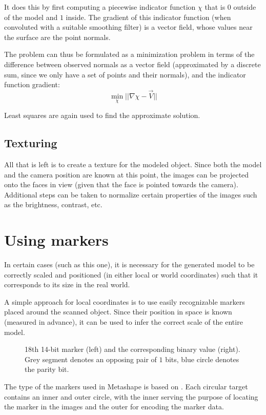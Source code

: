 It does this by first computing a piecewise indicator function $\chi$ that is $0$ outside of the model and $1$ inside. The gradient of this indicator function (when convoluted with a suitable smoothing filter) is a vector field, whose values near the surface are the point normals.

The problem can thus be formulated as a minimization problem in terms of the difference between observed normals as a vector field (approximated by a discrete sum, since we only have a set of points and their normals), and the indicator function gradient:
\begin{equation} \min_\chi || \nabla \chi - \vec{V}|| \end{equation}

Least squares are again used to find the approximate solution.

\subsection{Texturing}
All that is left is to create a texture for the modeled object.
Since both the model and the camera position are known at this point, the images can be projected onto the faces in view (given that the face is pointed towards the camera).
Additional steps can be taken to normalize certain properties of the images such as the brightness, contrast, etc.

\section{Using markers}
In certain cases (such as this one), it is necessary for the generated model to be correctly scaled and positioned (in either local or world coordinates) such that it corresponds to its size in the real world.

A simple approach for local coordinates is to use easily recognizable markers placed around the scanned object.
Since their position in space is known (measured in advance), it can be used to infer the correct scale of the entire model.

\begin{figure}[h]
	\centering
	
	\caption{18th 14-bit marker (left) and the corresponding binary value (right). Grey segment denotes an opposing pair of $1$ bits, blue circle denotes the parity bit.}
\end{figure}

The type of the markers used in Metashape is based on \citet{schneider19913,borisPatent}.
Each circular target contains an inner and outer circle, with the inner serving the purpose of locating the marker in the images and the outer for encoding the marker data.


